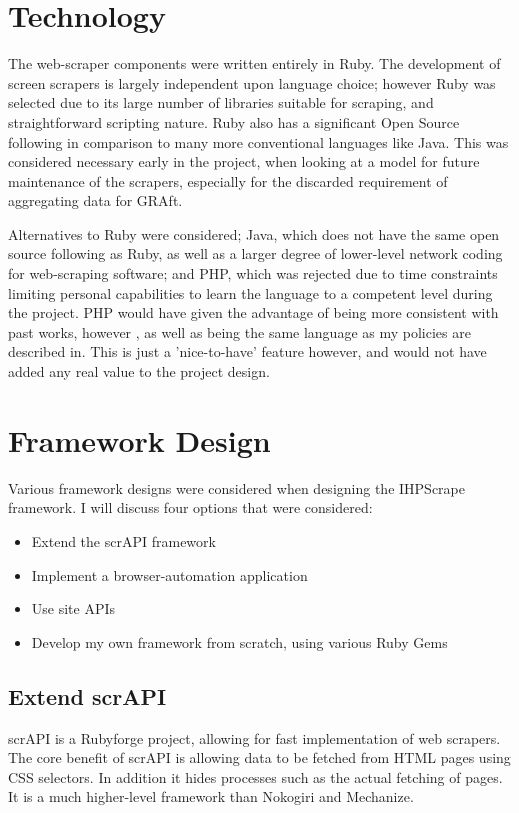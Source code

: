 \section{Technology}


The web-scraper components were written entirely in Ruby. The development of screen scrapers is largely independent upon language choice; however Ruby was selected due to its large number of libraries suitable for scraping, and straightforward scripting nature. Ruby also has a significant Open Source following in comparison to many more conventional languages like Java. This was considered necessary early in the project, when looking at a model for future maintenance of the scrapers, especially for the discarded requirement of aggregating data for GRAft. 

Alternatives to Ruby were considered; Java, which does not have the same open source following as Ruby, as well as a larger degree of lower-level network coding for web-scraping software; and PHP, which was rejected due to time constraints limiting personal capabilities to learn the language to a competent level during the project. PHP would have given the advantage of being more consistent with past works, however \cite{GRAft}, as well as being the same language as my policies are described in. This is just a 'nice-to-have' feature however, and would not have added any real value to the project design.

\section{Framework Design}

Various framework designs were considered when designing the IHPScrape framework. I will discuss four options that were considered:

\begin{itemize}
 \item Extend the scrAPI framework
 \item Implement a browser-automation application
 \item Use site APIs
 \item Develop my own framework from scratch, using various Ruby Gems
\end{itemize}

\subsection{Extend scrAPI}
scrAPI is a Rubyforge project, allowing for fast implementation of web scrapers. The core benefit of scrAPI is allowing data to be fetched from HTML pages using CSS selectors. In addition it hides processes such as the actual fetching of pages. It is a much higher-level framework than Nokogiri and Mechanize. 

